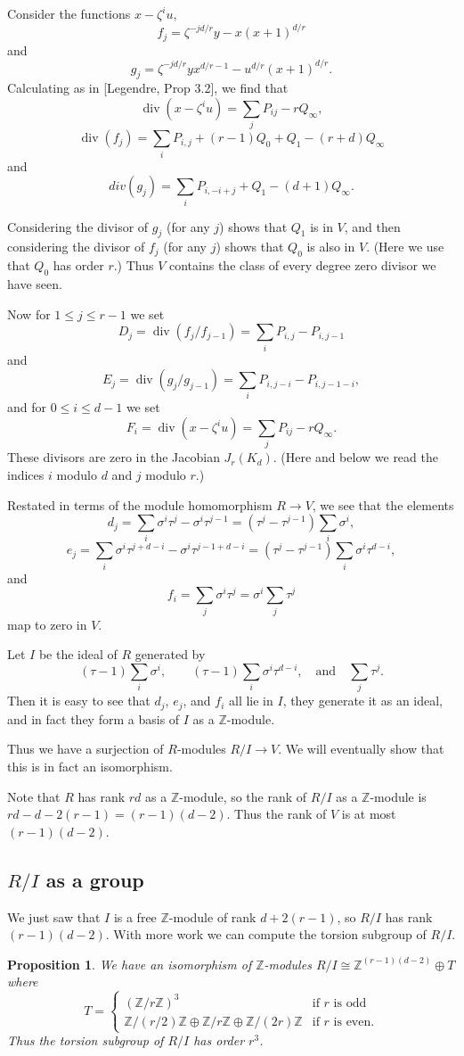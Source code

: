 \documentclass[reqno]{amsart}
\newtheorem{prop}[thm]{Proposition}
\theoremstyle{definition}
\theoremstyle{remark}
\DeclareMathOperator{\dvsr}{div}
\def\Z{\mathbb{Z}}
\begin{document}
Consider the functions $x-\zeta^iu$, 
$$f_j=\zeta^{-jd/r}y-x(x+1)^{d/r}$$
and 
$$g_j=\zeta^{-jd/r}yx^{d/r-1}-u^{d/r}(x+1)^{d/r}.$$
Calculating as in [Legendre, Prop 3.2], we find that
$$\dvsr(x-\zeta^iu)=\sum_j P_{ij}-rQ_\infty,$$
$$\dvsr(f_j)=\sum_iP_{i,j}+(r-1)Q_0+Q_1-(r+d)Q_\infty$$
and
$$div(g_j)=\sum_iP_{i,-i+j}+Q_1-(d+1)Q_\infty.$$

Considering the divisor of $g_j$ (for any $j$) shows that $Q_1$ is in
$V$, and then considering the divisor of $f_j$ (for any $j$) shows
that $Q_0$ is also in $V$.  (Here we use that $Q_0$ has order $r$.)  
Thus $V$ contains the class of every degree zero divisor we have
seen.

Now for $1\le j\le r-1$ we set
$$D_j=\dvsr(f_j/f_{j-1})=\sum_i P_{i,j}-P_{i,j-1}$$
and
$$E_j=\dvsr(g_j/g_{j-1})=\sum_i P_{i,j-i}-P_{i,j-1-i},$$
and for $0\le i\le d-1$ we set
$$F_i=\dvsr(x-\zeta^iu)=\sum_j P_{ij}-rQ_\infty.$$
These divisors are zero in the Jacobian $J_r(K_d)$.  (Here and below
we read the indices $i$ modulo $d$ and $j$ modulo $r$.)

Restated in terms of the module homomorphism $R\to V$, we see that the
elements 
$$d_j=\sum_i \sigma^i\tau^j-\sigma^i\tau^{j-1}
=(\tau^j-\tau^{j-1})\sum_i \sigma^i,$$
$$e_j=\sum_i \sigma^i\tau^{j+d-i}-\sigma^i\tau^{j-1+d-i}=
( \tau^{j}-\tau^{j-1})\sum_i\sigma^i\tau^{d-i},$$
and
$$f_i=\sum_j \sigma^i\tau^j=\sigma^i\sum_j\tau^j$$
map to zero in $V$.

Let $I$ be the ideal of $R$ generated by
$$(\tau-1)\sum_i \sigma^i,\qquad
(\tau-1)\sum_i\sigma^i\tau^{d-i}, \quad\text{and}\quad \sum_j\tau^j.$$
Then it is easy to see that $d_j$, $e_j$, and $f_i$ all lie in $I$,
they generate it as an ideal, and in fact they form a basis of $I$ as
a $\Z$-module.

Thus we have a surjection of $R$-modules $R/I\to V$.  We will
eventually show that this is in fact an isomorphism.

Note that $R$ has rank $rd$ as a $\Z$-module, so the rank of $R/I$ as
a $\Z$-module is $rd-d-2(r-1)=(r-1)(d-2)$.  Thus the rank of $V$ is at
most $(r-1)(d-2)$.  

\subsection{$R/I$ as a group}
We just saw that $I$ is a free $\Z$-module of rank $d+2(r-1)$, so
$R/I$ has rank $(r-1)(d-2)$.  With more work we can compute the torsion
subgroup of $R/I$.

\begin{prop}\label{prop:R/I-as-group}
We have an isomorphism of $\Z$-modules $R/I\cong \Z^{(r-1)(d-2)}\oplus
T$ where
$$T=\begin{cases}
(\Z/r\Z)^3&\text{if $r$ is odd}\\
\Z/(r/2)\Z\oplus\Z/r\Z\oplus\Z/(2r)\Z&\text{if $r$ is even.}
\end{cases}$$
Thus the torsion subgroup of $R/I$ has order $r^3$.
\end{prop}
\end{document}
